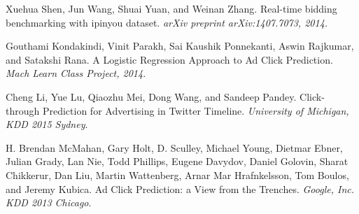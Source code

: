\documentclass{sig-alternate-05-2015}
\begin{document}
\begin{thebibliography}{4}
Xuehua Shen, Jun Wang, Shuai Yuan, and Weinan Zhang.
Real-time bidding benchmarking with ipinyou
dataset. 
\textit{arXiv preprint arXiv:1407.7073, 2014.}

Gouthami Kondakindi, Vinit Parakh, Sai Kaushik Ponnekanti, Aswin Rajkumar, and Satakshi Rana.
A Logistic Regression Approach to Ad Click
Prediction. 
\textit{Mach Learn Class Project, 2014}. 

Cheng Li, Yue Lu, Qiaozhu Mei, Dong Wang, and Sandeep Pandey.
Click-through Prediction for Advertising in Twitter Timeline. 
\textit{University of Michigan, KDD 2015 Sydney}. 

H. Brendan McMahan, Gary Holt, D. Sculley, Michael Young, Dietmar Ebner, Julian Grady, Lan Nie, Todd Phillips, Eugene Davydov, Daniel Golovin, Sharat Chikkerur, Dan Liu, Martin Wattenberg, Arnar Mar Hrafnkelsson, Tom Boulos, and Jeremy Kubica.
Ad Click Prediction: a View from the Trenches.
\textit{Google, Inc. KDD 2013 Chicago}. 

\end{thebibliography}
\end{document}

